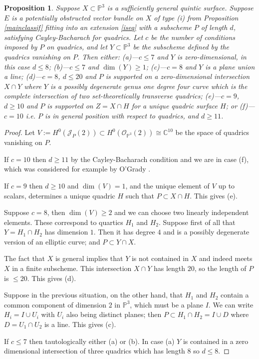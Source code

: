 \documentclass{amsart}
\theoremstyle{plain}
\newtheorem{proposition}[theorem]{Proposition}
\numberwithin{equation}{section}
\begin{document}
\begin{proposition}
\label{iclassif}
Suppose $X\subset {{\mathbb P}} ^3$ is a sufficiently general quintic surface. 
Suppose $E$ is a potentially obstructed 
vector bundle on $X$ of type (i) from Proposition \ref{mainclassif} fitting into an extension \eqref{iseq} with
a subscheme $P$ of length $d$, satisfying Cayley-Bacharach for quadrics. 
Let $c$ be the number of conditions imposed by $P$ on quadrics, and 
let $Y\subset {{\mathbb P}} ^3$
be the subscheme defined by the quadrics vanishing on $P$. Then either:
\newline
(a)---$c\leq 7$ and $Y$ is zero-dimensional, in this case $d\leq 8$; 
\newline
(b)---$c\leq 7$ and $\dim (Y)\geq 1$;
\newline
(c)---$c=8$ and $Y$ is a plane union a line;
\newline
(d)---$c=8$, $d\leq 20$ and $P$ is supported on a zero-dimensional intersection
$X\cap Y$ where $Y$ is a 
possibly degenerate genus one degree four curve
which is the complete intersection of two set-theoretically transverse quadrics;  
\newline
(e)---$c=9$, $d\geq 10$ and $P$ is supported on $Z=X\cap H$ for a unique quadric
surface $H$; or
\newline
(f)---$c=10$ i.e. $P$ is in general position with respect to quadrics, and $d\geq 11$.
\end{proposition}
\begin{proof}
Let $V:= H^0({{\mathcal J}} _P(2))\subset H^0({{\mathcal O}} _{{{\mathbb P}} ^3}(2))\cong {{\mathbb C}} ^{10}$ be the
space of quadrics vanishing on $P$. 

If $c=10$ then $d\geq 11$ by the Cayley-Bacharach condition and we are in case (f), which was considered for example
by O'Grady \cite[(3.29)]{OGradyBasic}.

If $c=9$ then $d\geq 10$ and
$\dim (V)=1$,
and the unique element of $V$ up to scalars, determines a unique quadric $H$ such that
$P\subset X\cap H$. This gives (e).

Suppose $c= 8$, then $\dim (V)\geq 2$ and we can choose two linearly independent
elements. These correspond to quartics $H_1$ and $H_2$. 
Suppose first of all that $Y=H_1\cap H_2$ has dimension $1$. Then it has degree $4$
and is a possibly degenerate version of an elliptic curve; and $P\subset Y\cap X$.

The fact that $X$ is general implies that $Y$ is not contained in $X$ and indeed meets
$X$ in a finite subscheme. This intersection $X\cap Y$ has length $20$, so the length of $P$ is
$\leq 20$. This gives (d).

Suppose in the previous situation, on the other hand, that 
$H_1$ and $H_2$ contain a common component of dimension $2$ in ${{\mathbb P}} ^3$,
which must be a plane $I$. We can write $H_i=I\cup U_i$ with $U_i$ also being
distinct planes; then $P\subset H_1\cap H_2= I\cup D$ where $D=U_1\cap U_2$ is a line.
This gives (c).

If $c\leq 7$ then tautologically either (a) or (b). In case (a)
$Y$ is contained in a zero dimensional intersection of three quadrics which has length $8$
so $d\leq 8$. 
\end{proof}
\end{document}
